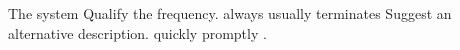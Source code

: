 \documentclass{article}
\begin{document}
The system %
  {Qualify the frequency.}
  {always}
  {usually} %
terminates %
  {Suggest an alternative description.}
  {quickly}
  {promptly}%
.
\end{document}
